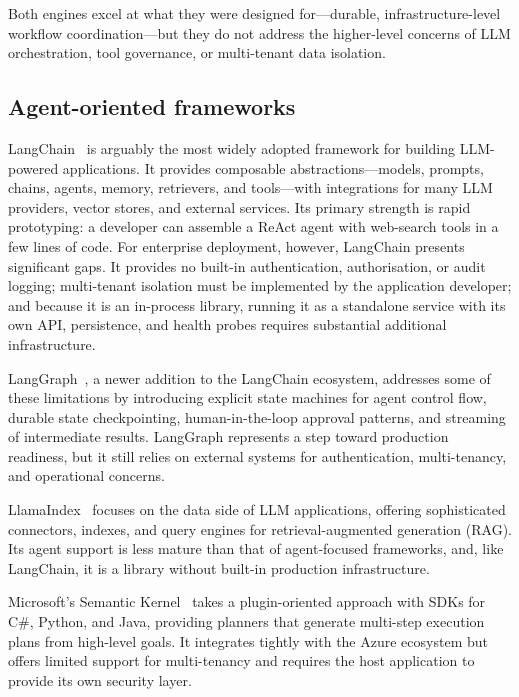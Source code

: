 \documentclass[a4paper,noexaminfo]{sapthesis}
\begin{document}
Both engines excel at what they were designed for---durable, infrastructure-level
workflow coordination---but they do not address the higher-level concerns
of LLM orchestration, tool governance, or multi-tenant data isolation.

\subsection{Agent-oriented frameworks}

LangChain~\cite{langchain2023} is arguably the most widely adopted
framework for building LLM-powered applications.  It provides composable
abstractions---models, prompts, chains, agents, memory, retrievers, and
tools---with integrations for many LLM providers, vector
stores, and external services.  Its primary strength is rapid prototyping:
a developer can assemble a ReAct agent with web-search tools in a few
lines of code.  For enterprise deployment, however, LangChain presents
significant gaps.  It provides no built-in authentication, authorisation,
or audit logging; multi-tenant isolation must be implemented by the
application developer; and because it is an in-process library, running it
as a standalone service with its own API, persistence, and health probes
requires substantial additional infrastructure.

LangGraph~\cite{langgraph2024}, a newer addition to the LangChain
ecosystem, addresses some of these limitations by introducing explicit
state machines for agent control flow, durable state checkpointing,
human-in-the-loop approval patterns, and streaming of intermediate
results.  LangGraph represents a step toward production readiness, but it
still relies on external systems for authentication, multi-tenancy, and
operational concerns.

LlamaIndex~\cite{llamaindex2023} focuses on the data side of LLM
applications, offering sophisticated connectors, indexes, and query engines
for retrieval-augmented generation (RAG).  Its agent support is less mature
than that of agent-focused frameworks, and, like LangChain, it is a
library without built-in production infrastructure.

Microsoft's Semantic Kernel~\cite{semantickernel2023} takes a
plugin-oriented approach with SDKs for C\#, Python, and Java, providing
planners that generate multi-step execution plans from high-level goals.
It integrates tightly with the Azure ecosystem but offers limited support
for multi-tenancy and requires the host application to provide its own
security layer.
\end{document}
